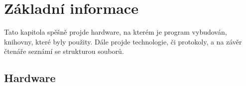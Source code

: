 \documentclass[a4paper,oneside,12pt]{report}
\begin{document}


\tableofcontents


\newpage



\setcounter{page}{1}

\chapter{Základní informace}

Tato kapitola spěšně projde hardware, na kterém je program vybudován, knihovny, které byly použity.
Dále projde technologie, či protokoly, a na závěr čtenáře seznámí se strukturou souborů.

\section{Hardware}
\end{document}
